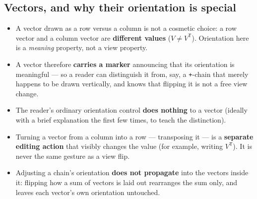 \documentclass[11pt]{article}
\newcommand{\req}[1]{\textbf{\color{accent}#1}}
\begin{document}
\subsection{Vectors, and why their orientation is special}
\begin{itemize}[leftmargin=1.4em,itemsep=3pt]
  \item A vector drawn as a row versus a column is not a cosmetic choice: a row vector and a column vector are \req{different values} ($V \neq V^{\mathsf{T}}$). Orientation here is a \emph{meaning} property, not a view property.
  \item A vector therefore \req{carries a marker} announcing that its orientation is meaningful --- so a reader can distinguish it from, say, a \texttt{+}-chain that merely happens to be drawn vertically, and knows that flipping it is not a free view change.
  \item The reader's ordinary orientation control \req{does nothing} to a vector (ideally with a brief explanation the first few times, to teach the distinction).
  \item Turning a vector from a column into a row --- transposing it --- is a \req{separate editing action} that visibly changes the value (for example, writing $V^{\mathsf{T}}$). It is never the same gesture as a view flip.
  \item Adjusting a chain's orientation \req{does not propagate} into the vectors inside it: flipping how a sum of vectors is laid out rearranges the sum only, and leaves each vector's own orientation untouched.
\end{itemize}
\end{document}
